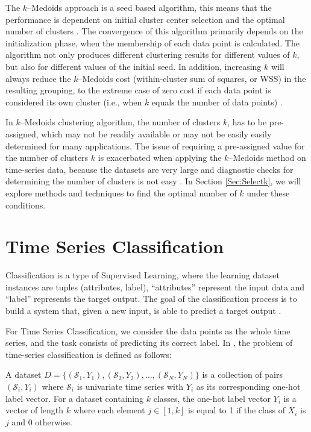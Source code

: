 The $k$--Medoids approach is a seed based algorithm, this means that the performance is dependent on initial cluster center selection and the optimal number of clusters \cite{Chowdhury2019}. The convergence of this algorithm primarily depends on the initialization phase, when the membership of each data point is calculated. The algorithm not only produces different clustering results for different values of $k$, but also for different values of the initial seed. In addition, increasing $k$ will always reduce the $k$--Medoids cost (within-cluster sum of squares, or WSS) in the resulting grouping, to the extreme case of zero cost if each data point is considered its own cluster (i.e., when $k$ equals the number of data points) \cite{HastieTF2009}. 

In $k$--Medoids clustering algorithm, the number of clusters $k$, has to be pre-assigned, which may not be readily available or may not be easily easily determined for many applications. The issue of requiring a pre-assigned value for the number of clusters $k$ is exacerbated when applying the $k$--Medoids method on time-series data, because the datasets are very large and diagnostic checks for determining the number of clusters is not easy \cite{Aghabozorgi2015}. In Section \ref{Sec:Selectk}, we will explore methods and techniques to find the optimal number of $k$ under these conditions.

\section{Time Series Classification} 
\label{Sec:TimeSeriesClassification}

Classification is a type of Supervised Learning, where the learning dataset instances are tuples (attributes, label), ``attributes'' represent the input data and ``label'' represents the target output. The goal of the classification process is to build a system that, given a new input, is able to predict a target output \cite{Mohri2012}. 

For Time Series Classification, we consider the data points as the whole time series, and the task consists of predicting its correct label. In \cite{Fawaz2019}, the problem of time-series classification is defined as follows: 

\begin{definition}
A dataset $D=\{(\mathcal{S}_1,Y_1),(\mathcal{S}_2,Y_2), \ldots ,(\mathcal{S}_N,Y_N)\}$ is a collection of pairs $(\mathcal{S}_i,Y_i)$ where $\mathcal{S}_i$ is univariate time series with $Y_i$ as its corresponding one-hot label vector.  For a dataset containing $k$ classes, the one-hot label vector $Y_i$ is a vector of length $k$ where each element $j \in [1,k]$ is equal to 1 if the class of $X_i$ is $j$ and $0$ otherwise.
\end{definition}

